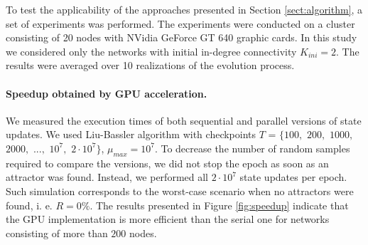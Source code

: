 \documentclass[procedia]{easychair}
\begin{document}
	To test the applicability of the approaches presented in Section \ref{sect:algorithm}, a set of experiments was performed. The experiments were conducted on a cluster consisting of 20 nodes with NVidia GeForce GT 640 graphic cards. In this study we considered only the networks with initial in-degree connectivity $K_{ini}=2$. The results were averaged over 10 realizations of the evolution process.
	
	\paragraph{Speedup obtained by GPU acceleration.} We measured the execution times of both sequential and parallel versions of state updates. We used Liu-Bassler algorithm with checkpoints $T$ = $\{100,$ $200,$ $1000,$ $2000,$ $...,$ $10^7,$ $2 \cdot 10^7\}$, $\mu_{max} = 10^7$. To decrease the number of random samples required to compare the versions, we did not stop the epoch as soon as an attractor was found. Instead, we performed all $2 \cdot 10^7$ state updates per epoch. Such simulation corresponds to the worst-case scenario when no attractors were found, i. e. $R = 0\%$. The results presented in Figure \ref{fig:speedup} indicate that the GPU implementation is more efficient than the serial one for networks consisting of more than $200$ nodes.
	
\end{document}
